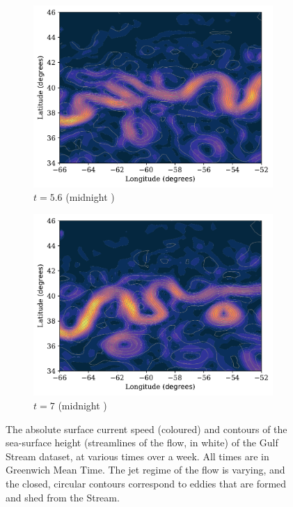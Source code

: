 \begin{figure}
\begin{center}
\begin{subfigure}{0.49\textwidth}
			\includegraphics[width=\textwidth]{chp02_background/figures/gulf_stream_motivation/streamlines_4.pdf}
			\caption{\(t =5.6\) (midnight )}
		\end{subfigure}
		\begin{subfigure}{0.49\textwidth}
			\includegraphics[width=\textwidth]{chp02_background/figures/gulf_stream_motivation/streamlines_5.pdf}
			\caption{\(t = 7\) (midnight )}
		\end{subfigure}

		\caption{The absolute surface current speed (coloured) and contours of the sea-surface height (streamlines of the flow, in white) of the Gulf Stream dataset, at various times over a week.
			All times are in Greenwich Mean Time.
			The jet regime of the flow is varying, and the closed, circular contours correspond to eddies that are formed and shed from the Stream.}
		\label{fig:na_motive_flow}
	\end{center}
\end{figure}

